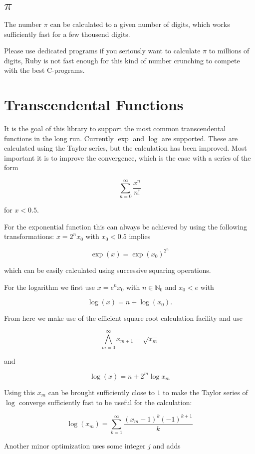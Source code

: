 \documentclass[10pt,a4paper]{article}
\begin{document}
\section{$\pi$}

The number $\pi$ can be calculated to a given number of digits, which
works sufficiently fast for a few thousend digits.

Please use dedicated programs if you seriously want to calculate $\pi$
to millions of digits, Ruby is not fast enough for this kind of number
crunching to compete with the best C-programs.

\pagebreak

\section{Transcendental Functions}

It is the goal of this library to support the most common
transcendental functions in the long run.  Currently $\exp$ and $\log$
are supported.  These are calculated using the Taylor series, but the
calculation has been improved.  Most important it is to improve the
convergence, which is the case with a series of the form

$$\sum_{n=0}^\infty \frac{x^n}{n!}$$

for $x< 0.5$.

For the exponential function this can always be achieved by using the following transformations: $x = 2^n x_0$ with $x_0 < 0.5$ implies

$$\exp(x) = \exp(x_0)^{2^n}$$

which can be easily calculated using successive squaring operations.

For the logarithm we first use $x = e^n x_0$ with $n \in \mathbb{N}_0$ and $x_0 < e$ with

$$\log(x) = n + \log(x_0).$$

From here we make use of the efficient square root calculation facility and use 

$$\bigwedge_{m=0}^\infty x_{m+1} = \sqrt{x_m}$$

and

$$\log(x) = n + 2^m \log x_m$$

Using this $x_m$ can be brought sufficiently close to $1$ to make the Taylor series of $\log$ converge sufficiently fast to be useful for the calculation:

$$\log(x_m) = \sum_{k=1}^\infty \frac{(x_m-1)^k(-1)^{k+1}}{k}$$

Another minor optimization uses some integer $j$ and adds
\end{document}
